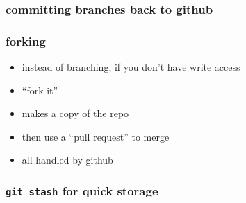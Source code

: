 \documentclass[ignorenonframetext,]{beamer}
\begin{document}
\begin{frame}\frametitle{committing branches back to github}

\end{frame}

\begin{frame}\frametitle{forking}

\begin{itemize}[<+->]
\item
  instead of branching, if you don't have write access
\item
  ``fork it''
\item
  makes a copy of the repo
\item
  then use a ``pull request'' to merge
\item
  all handled by github
\end{itemize}

\end{frame}

\begin{frame}\frametitle{\texttt{git stash} for quick storage}

\end{frame}
\end{document}
